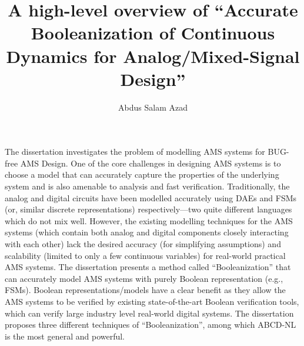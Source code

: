 \documentclass[a4paper]{article}
\title{A high-level overview of ``Accurate Booleanization of Continuous Dynamics for Analog/Mixed-Signal Design''}
\author{Abdus Salam Azad}
\begin{document}
\maketitle



The dissertation investigates the problem of modelling AMS systems for BUG-free AMS Design. One of the core challenges in designing AMS systems is to choose a model that can accurately capture the properties of the underlying system and is also amenable to analysis and fast verification. Traditionally, the analog and digital circuits have been modelled accurately using DAEs and FSMs (or, similar discrete representations) respectively---two quite different languages which do not mix well. However, the existing modelling techniques for the AMS systems (which contain both analog and digital components closely interacting with each other) lack the desired accuracy (for simplifying assumptions) and scalability (limited to only a few continuous variables) for real-world practical AMS systems. The dissertation presents a method called ``Booleanization'' that can accurately model AMS systems with purely Boolean representation (e.g., FSMs). Boolean representations/models have a clear benefit as they allow the AMS systems to be verified by existing state-of-the-art Boolean verification tools, which can verify large industry level real-world digital systems. The dissertation proposes three different techniques of ``Booleanization'', among which ABCD-NL is the most general and powerful. %
\end{document}
